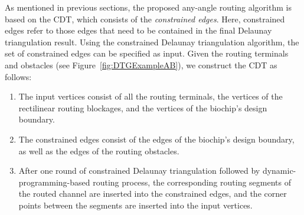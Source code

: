 \documentclass[journal]{IEEEtran}
\begin{document}
As mentioned in previous sections, the proposed any-angle routing
algorithm is based on the CDT, which consists of the {\em constrained edges}.
Here, constrained edges refer to those edges that need to be contained in the
final Delaunay triangulation result. Using the constrained Delaunay triangulation algorithm, the set of constrained edges can be specified as input. Given the routing terminals and obstacles (see Figure~\ref{fig:DTGExampleAB}), we construct the CDT as follows:

\begin{enumerate}
\item The input vertices consist of all the routing terminals, the vertices of the rectilinear routing blockages, and the vertices of the biochip's design boundary.

\item The constrained edges consist of the edges of the biochip's design boundary, as well as the edges of the routing obstacles.

\item After one round of constrained Delaunay triangulation followed by 
dynamic-programming-based routing process, the corresponding routing
 segments of the routed channel are inserted into the constrained edges, 
and the corner points between the segments are inserted into the input
 vertices.
\end{enumerate}
\end{document}
